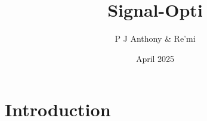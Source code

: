 \documentclass{article}
\title{Signal-Opti}
\author{P J Anthony & Re'mi}
\date{April 2025}
\begin{document}
\maketitle

\section{Introduction}
\end{document}
